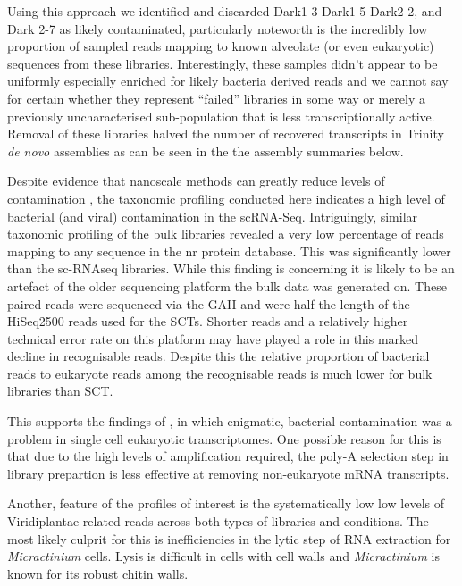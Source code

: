 Using this approach we identified and discarded Dark1-3 Dark1-5 Dark2-2, and Dark 2-7 as likely contaminated, particularly noteworth is the incredibly
low proportion of sampled reads mapping to known alveolate (or even eukaryotic) sequences from these libraries.   
Interestingly, these samples didn't appear to be uniformly especially enriched for likely bacteria derived reads and we cannot say for certain whether they represent
``failed'' libraries in some way or merely a previously uncharacterised sub-population that is less transcriptionally active. 
Removal of these libraries halved the number of recovered transcripts in Trinity \textit{de novo} assemblies as can be seen in the the assembly
summaries below.

Despite evidence that nanoscale methods can greatly reduce levels of contamination \citep{Blainey2011}, the taxonomic profiling conducted here
indicates a high level of bacterial (and viral) contamination in the scRNA-Seq.  Intriguingly, similar taxonomic profiling of the bulk
libraries revealed a very low percentage of reads mapping to any sequence in the nr protein database.  This was significantly lower than the
sc-RNAseq libraries.  While this finding is concerning it is likely to be an artefact of the older sequencing platform the bulk data was generated on.
These paired reads were sequenced via the GAII and were half the length of the HiSeq2500 reads used for the SCTs.  Shorter reads and a relatively higher
technical error rate on this platform may have played a role in this marked decline in recognisable reads. 
Despite this the relative proportion of bacterial reads to eukaryote reads among the recognisable reads is much lower for bulk libraries than SCT.

This supports the findings of \citep{Kolisko2014}, in which enigmatic, bacterial contamination was a problem in single cell eukaryotic
transcriptomes.   One possible reason for this is that due to the high levels of amplification required, the poly-A selection step
in library prepartion is less effective at removing non-eukaryote mRNA transcripts.


Another, feature of the profiles of interest is the systematically low 
low levels of Viridiplantae related reads across both types of libraries and conditions.  The most likely culprit for
this is inefficiencies in the lytic step of RNA extraction for \textit{Micractinium} cells. 
Lysis is difficult in cells
with cell walls \citep{Korfhage2015} and \textit{Micractinium} is known for its robust chitin walls. 

